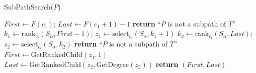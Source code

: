 \begin{algorithm}[H]
    \caption{SubPathSearch($P$)}
    \label{alg:subpathsearch}
    \begin{algorithmic}[1]
    \State $First \gets F(c_1)$; $Last \gets F(c_1 + 1) - 1$
        \State \textbf{return} ``$P$ is not a subpath of $T$''
    \EndIf
        \State $k_1 \gets \text{rank}_{c_i}(S_\alpha, First - 1)$; $z_1 \gets \text{select}_{c_i}(S_\alpha, k_1 + 1)$
        \State $k_2 \gets \text{rank}_{c_i}(S_\alpha, Last)$; $z_2 \gets \text{select}_{c_i}(S_\alpha, k_2)$
            \State \textbf{return} ``$P$ is not a subpath of $T$''
        \EndIf
        \State $First \gets \text{GetRankedChild}(z_1, 1)$ 
        \State $Last \gets \text{GetRankedChild}(z_2, \text{GetDegree}(z_2))$ 
    \EndFor
    \State \textbf{return} $(First, Last)$
    \end{algorithmic}
\end{algorithm}
